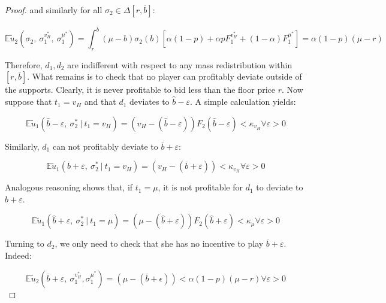 \begin{proof}
\noindent and similarly for all $ \sigma_2 \in \Delta[r, \overline{b}] $:

\begin{equation*}
\mathbb{E} \tilde{u}_2 \left( \sigma_2,\ \sigma_1^{v_H^*},\ \sigma_1^{\mu^*} \right) = \int_{r}^{\overline{b}} (\mu - b) \sigma_2(b) \left[ \alpha (1 - p) + \alpha p F_1^{v_H^*} + (1 - \alpha) F_1^{\mu^*} \right] = \alpha (1 - p)(\mu - r)
\end{equation*}

\noindent Therefore, $ d_1, d_2 $ are indifferent with respect to any mass redistribution within $ \left[ r, \overline{b} \right] $. What remains is to check that no player can profitably deviate outside of the supports. Clearly, it is never profitable to bid less than the floor price $ r $. Now suppose that $ t_1 = v_H $ and that $ d_1 $ deviates to $ \hat{b}-\varepsilon $. A simple calculation yields:

\begin{equation*}
 \mathbb{E} \tilde{u}_1 \left( \hat{b}-\varepsilon,\ \sigma_2^* \ | \ t_1 = v_H \right) = \left(v_H - (\hat{b} - \varepsilon) \right) F_2 \left( \hat{b} - \varepsilon \right) < \kappa_{v_H}  \forall \varepsilon > 0
\end{equation*}

\noindent Similarly, $ d_1 $ can not profitably deviate to $ \overline{b} + \varepsilon $:

\begin{equation*}
 \mathbb{E} \tilde{u}_1 \left( \overline{b} + \varepsilon,\ \sigma_2^* \ | \ t_1 = v_H \right) = \left(v_H - (\overline{b} + \varepsilon) \right) < \kappa_{v_H}  \forall \varepsilon > 0
\end{equation*}

\noindent Analogous reasoning shows that, if $ t_1 = \mu $, it is not profitable for $ d_1 $ to deviate to $ \hat{b} + \varepsilon $.

\begin{equation*}
 \mathbb{E} \tilde{u}_1 \left( \hat{b} + \varepsilon,\ \sigma_2^* \ | \ t_1 = \mu \right) = \left( \mu - (\hat{b} + \varepsilon) \right) F_2 \left( \hat{b} + \varepsilon \right) < \kappa_{\mu}  \forall \varepsilon > 0
\end{equation*}

\noindent Turning to $ d_2 $, we only need to check that she has no incentive to play $ \overline{b} + \varepsilon $. Indeed:

\begin{equation*}
 \mathbb{E} \tilde{u}_2 \left( \overline{b} + \varepsilon,\ \sigma_1^{v_H^*}, \sigma_1^{\mu^*} \right) = \left( \mu - (\overline{b} + \epsilon) \right) < \alpha (1 - p) (\mu - r)  \forall \varepsilon > 0
\end{equation*}


\end{proof}
